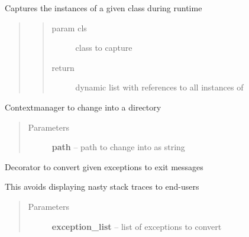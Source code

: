 \documentclass[letterpaper,10pt,english]{sphinxmanual}
\begin{document}
\begin{fulllineitems}
\label{_rst/pyscaffold:pyscaffold.utils.capture_objs}
Captures the instances of a given class during runtime
\begin{quote}
\begin{quote}\begin{description}
\item[{param cls}] \leavevmode
class to capture

\item[{return}] \leavevmode
dynamic list with references to all instances of 

\end{description}\end{quote}
\end{quote}

\end{fulllineitems}


\begin{fulllineitems}
\label{_rst/pyscaffold:pyscaffold.utils.chdir}
Contextmanager to change into a directory
\begin{quote}\begin{description}
\item[{Parameters}] \leavevmode
\textbf{path} -- path to change into as string

\end{description}\end{quote}

\end{fulllineitems}


\begin{fulllineitems}
\label{_rst/pyscaffold:pyscaffold.utils.exceptions2exit}
Decorator to convert given exceptions to exit messages

This avoids displaying nasty stack traces to end-users
\begin{quote}\begin{description}
\item[{Parameters}] \leavevmode
\textbf{exception\_list} -- list of exceptions to convert

\end{description}\end{quote}

\end{fulllineitems}
\end{document}
